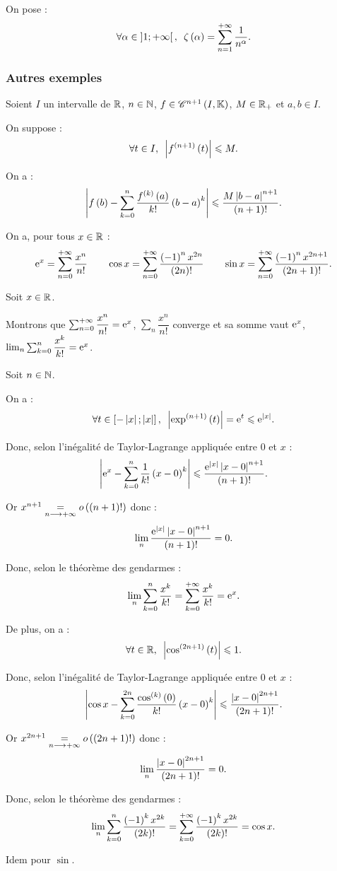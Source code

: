 \begin{nota}
On pose : \[\quantifs{\forall\alpha\in\intervee{1}{\pinf}}\zeta\paren{\alpha}=\sum_{n=1}^{\pinf}\dfrac{1}{n^\alpha}.\]
\end{nota}

\subsubsection{Autres exemples}

\begin{rappel}
Soient \(I\) un intervalle de \(\mathbb{R}\), \(n\in\mathbb{N}\), \(f\in\mathscr{C}^{n+1}\left(I,\mathbb{K}\right)\), \(M\in\mathbb{R}_+\) et \(a,b\in I\).

On suppose : \[\quantifs{\forall t\in I}\abs{f\deriv{n+1}\paren{t}}\leq M.\]

On a : \[\left\lvert f\left(b\right)-\sum_{k=0}^n\dfrac{f^{\left(k\right)}\left(a\right)}{k!}\left(b-a\right)^k\right\rvert\leqslant\dfrac{M\left\lvert b-a\right\rvert^{n+1}}{\left(n+1\right)!}.\]
\end{rappel}

\begin{prop}
On a, pour tous \(x\in\mathbb{R}\) : \[\mathrm{e}^{x}=\sum_{n=0}^{+\infty}\dfrac{x^n}{n!}\qquad\cos x=\sum_{n=0}^{+\infty}\dfrac{\left(-1\right)^nx^{2n}}{\left(2n\right)!}\qquad\sin x=\sum_{n=0}^{+\infty}\dfrac{\left(-1\right)^nx^{2n+1}}{\left(2n+1\right)!}.\]
\end{prop}

\begin{dem}
Soit \(x\in\mathbb{R}\).

Montrons que \(\sum_{n=0}^{+\infty}\dfrac{x^n}{n!}=\mathrm{e}^{x}\), \cad \(\sum_n\dfrac{x^n}{n!}\) converge et sa somme vaut \(\mathrm{e}^{x}\), \cad \(\lim_n\sum_{k=0}^n\dfrac{x^k}{k!}=\mathrm{e}^{x}\).

Soit \(n\in\mathbb{N}\).

On a : \[\quantifs{\forall t\in\intervii{-\abs{x}}{\abs{x}}}\abs{\exp\deriv{n+1}\paren{t}}=\e{t}\leq\e{\abs{x}}.\]

Donc, selon l'inégalité de Taylor-Lagrange appliquée entre \(0\) et \(x\) : \[\left\lvert\mathrm{e}^{x}-\sum_{k=0}^n\dfrac{1}{k!}\left(x-0\right)^k\right\rvert\leqslant\dfrac{\mathrm{e}^{\left\lvert x\right\rvert}\left\lvert x-0\right\rvert^{n+1}}{\left(n+1\right)!}.\]

Or \(x^{n+1}\underset{n\longrightarrow+\infty}{=}o\left(\left(n+1\right)!\right)\) donc : \[\lim_n\dfrac{\mathrm{e}^{\left\lvert x\right\rvert}\left\lvert x-0\right\rvert^{n+1}}{\left(n+1\right)!}=0.\]

Donc, selon le théorème des gendarmes : \[\lim_n\sum_{k=0}^n\dfrac{x^k}{k!}=\sum_{k=0}^{+\infty}\dfrac{x^k}{k!}=\mathrm{e}^{x}.\]

De plus, on a : \[\quantifs{\forall t\in\R}\abs{\cos\deriv{2n+1}\paren{t}}\leq1.\]

Donc, selon l'inégalité de Taylor-Lagrange appliquée entre \(0\) et \(x\) : \[\left\lvert\cos x-\sum_{k=0}^{2n}\dfrac{\cos^{\left(k\right)}\left(0\right)}{k!}\left(x-0\right)^k\right\rvert\leqslant\dfrac{\left\lvert x-0\right\rvert^{2n+1}}{\left(2n+1\right)!}.\]

Or \(x^{2n+1}\underset{n\longrightarrow+\infty}{=}o\left(\left(2n+1\right)!\right)\) donc : \[\lim_n\dfrac{\left\lvert x-0\right\rvert^{2n+1}}{\left(2n+1\right)!}=0.\]

Donc, selon le théorème des gendarmes : \[\lim_n\sum_{k=0}^n\dfrac{\left(-1\right)^kx^{2k}}{\left(2k\right)!}=\sum_{k=0}^{+\infty}\dfrac{\left(-1\right)^kx^{2k}}{\left(2k\right)!}=\cos x.\]

Idem pour \(\sin\).
\end{dem}